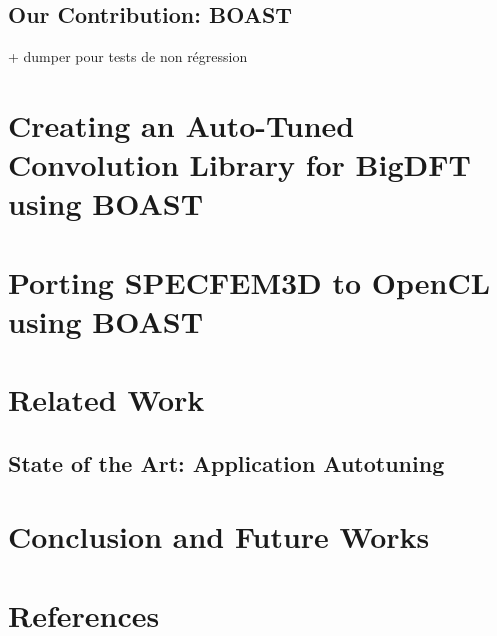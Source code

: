 \documentclass[review]{elsarticle}
\begin{document}
  \subsection{Our Contribution: BOAST}
  \cite{videau2013boast}
     + dumper pour tests de non régression


\section{Creating an Auto-Tuned Convolution Library for BigDFT using BOAST}



\section{Porting SPECFEM3D to OpenCL using BOAST}



\section{Related Work}

  \subsection{State of the Art: Application Autotuning}


\section{Conclusion and Future Works}


\section*{References}


\end{document}
